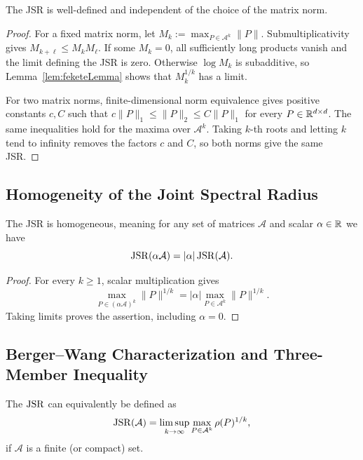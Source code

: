 \begin{theorem}\citep{RotaStrang1960NoteJSR,Jungers2009JointSpectralRadius}
    \label{thm:jsrWellDefined}
    The JSR is well-defined and independent of the choice of the matrix norm.
\end{theorem}

\begin{proof}
    For a fixed matrix norm, let $M_k:=\max_{P\in\mathcal{A}^k}\lVert P\rVert$.
    Submultiplicativity gives $M_{k+\ell}\leq M_kM_\ell$.
    If some $M_k=0$, all sufficiently long products vanish and the limit defining the JSR is zero.
    Otherwise $\log M_k$ is subadditive, so Lemma~\ref{lem:feketeLemma} shows that $M_k^{1/k}$ has a limit.

    For two matrix norms, finite-dimensional norm equivalence gives positive constants $c,C$ such that $c\lVert P\rVert_1\leq\lVert P\rVert_2\leq C\lVert P\rVert_1$ for every $P\in\mathbb{R}^{d\times d}$.
    The same inequalities hold for the maxima over $\mathcal{A}^k$.
    Taking $k$-th roots and letting $k$ tend to infinity removes the factors $c$ and $C$, so both norms give the same JSR.
\end{proof}

\subsection*{Homogeneity of the Joint Spectral Radius}
\begin{proposition}\citep{Jungers2009JointSpectralRadius}
    \label{prop:jsrHomogeneity}
    The JSR is homogeneous, meaning for any set of matrices $\mathcal{A}$ and scalar $\alpha \in \mathbb{R}$ we have
    \begin{equation}
        \operatorname{JSR}(\alpha \mathcal{A}) = |\alpha| \operatorname{JSR}(\mathcal{A}).
    \end{equation}
\end{proposition}
\begin{proof}
    For every $k\geq1$, scalar multiplication gives
    \[
        \max_{P\in(\alpha\mathcal{A})^k}\lVert P\rVert^{1/k}
        =|\alpha|\max_{P\in\mathcal{A}^k}\lVert P\rVert^{1/k}.
    \]
    Taking limits proves the assertion, including $\alpha=0$.
\end{proof}

\subsection*{Berger--Wang Characterization and Three-Member Inequality}
\begin{proposition}\citep{BergerWang1992BoundedSemigroupsMatrices}
    \label{prop:bergerWangCharacterization}
    The $\operatorname{JSR}$ can equivalently be defined as
    \[
        \operatorname{JSR}(\mathcal{A}) = \limsup_{k \to \infty} \max_{P \in \mathcal{A}^k} \rho(P)^{1/k},
    \]
    if $\mathcal{A}$ is a finite (or compact) set.
\end{proposition}

